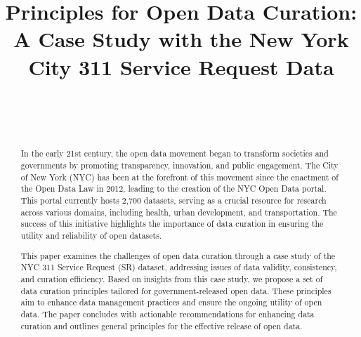 \documentclass[linenumber]{jdsart}
\begin{document}
\begin{frontmatter}
  
\title{Principles for Open Data Curation: A Case Study with the New
York City 311 Service Request Data}

\author[1]{~}
\author[2]{~}
\address[1]{, }
\address[2]{Department of Statistics,
  , }



 \tableofcontents %
 \listoffigures %
 \listoftables %


\begin{abstract}
In the early 21st century, the open data movement began to transform 
societies and governments by promoting transparency,
innovation, and public engagement. The City of New York (NYC) has been at
the forefront of this movement since the enactment of the Open 
Data Law in 2012, leading to the creation of the NYC Open Data
portal. This portal currently hosts 2,700 datasets,
serving as a crucial resource for research across various domains, 
including health, urban development, and transportation. The 
success of this initiative highlights the importance of data 
curation in ensuring the utility and reliability of open datasets.


This paper examines the challenges of open data curation through a
case study of the NYC 311 Service Request (SR) dataset, addressing issues 
of data validity, consistency, and curation efficiency. Based on 
insights from this case study, we propose a set of data curation 
principles tailored for government\mbox{-}released open data. These principles 
aim to enhance data management practices and ensure 
the ongoing utility of open data. The paper concludes with 
actionable recommendations for enhancing data curation and outlines
general principles for the effective release of open data.

\end{abstract}

\begin{keywords}
\end{keywords}

\end{frontmatter}
\end{document}
